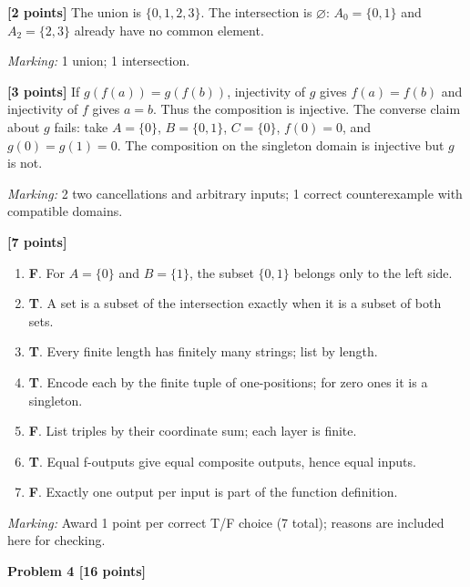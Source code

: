 \documentclass[12pt,letterpaper]{article}
\newcommand{\problemheading}[2][5\baselineskip]{\Needspace{#1}\par\noindent\hspace*{-0.625in}\textbf{#2}\par\nobreak\vspace{0.3em}}
\begin{document}
\begin{description}[font=\normalfont,leftmargin=1.2em,labelsep=0.4em]
\item[(a)] \textbf{[2 points]} The union is $\{0,1,2,3\}$. The intersection is $\varnothing$: $A_0=\{0,1\}$ and $A_2=\{2,3\}$ already have no common element.
\par\textit{Marking:} 1 union; 1 intersection.
\item[(b)] \textbf{[3 points]} If $g(f(a))=g(f(b))$, injectivity of $g$ gives $f(a)=f(b)$ and injectivity of $f$ gives $a=b$. Thus the composition is injective. The converse claim about $g$ fails: take $A=\{0\}$, $B=\{0,1\}$, $C=\{0\}$, $f(0)=0$, and $g(0)=g(1)=0$. The composition on the singleton domain is injective but $g$ is not.
\par\textit{Marking:} 2 two cancellations and arbitrary inputs; 1 correct counterexample with compatible domains.
\item[(c)] \textbf{[7 points]} \begin{enumerate}[label=(\roman*)]\item \textbf{F}. For $A=\{0\}$ and $B=\{1\}$, the subset $\{0,1\}$ belongs only to the left side.\item \textbf{T}. A set is a subset of the intersection exactly when it is a subset of both sets.\item \textbf{T}. Every finite length has finitely many strings; list by length.\item \textbf{T}. Encode each by the finite tuple of one-positions; for zero ones it is a singleton.\item \textbf{F}. List triples by their coordinate sum; each layer is finite.\item \textbf{T}. Equal f-outputs give equal composite outputs, hence equal inputs.\item \textbf{F}. Exactly one output per input is part of the function definition.\end{enumerate}
\par\textit{Marking:} Award 1 point per correct T/F choice (7 total); reasons are included here for checking.
\end{description}
\vspace{0.65em}
\problemheading[\dimexpr 3\baselineskip+4\baselineskip\relax]{Problem 4 [16 points]}
\end{document}
